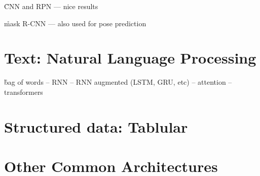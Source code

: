 \r{CNN and RPN --- nice results }

\r{mask R-CNN --- also used for pose prediction}



\section{Text: Natural Language Processing}

\r{bag of words -- RNN -- RNN augmented (LSTM, GRU, etc) -- attention -- transformers }


\section{Structured data: Tablular}


\section{Other Common Architectures}

